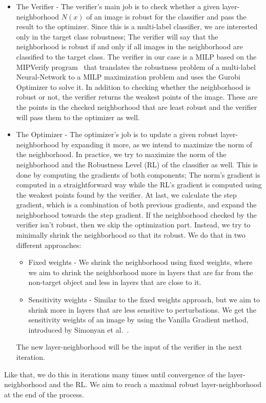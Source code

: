 \begin{itemize}
    \item The Verifier - The verifier's main job is to check whether a given layer-neighborhood $N(x)$ of an image is robust for the classifier and pass the result to the optimizer.
    Since this is a multi-label classifier, we are interested only in the target class robustness;
    The verifier will say that the neighborhood is robust if and only if all images in the neighborhood are classified to the target class.
    The verifier in our case is a MILP based on the MIPVerify program~\cite{MIPVERIFY} that translates the robustness problem of a multi-label Neural-Network to a MILP maximization problem and uses the Gurobi Optimizer to solve it.
    In addition to checking whether the neighborhood is robust or not, the verifier returns the weakest points of the image.
    These are the points in the checked neighborhood that are least robust and the verifier will pass them to the optimizer as well.
    \item The Optimizer - The optimizer's job is to update a given robust layer-neighborhood by expanding it more, as we intend to maximize the norm of the neighborhood.
    In practice, we try to maximize the norm of the neighborhood and the Robustness Level (RL) of the classifier as well.
    This is done by computing the gradients of both components;
    The norm's gradient is computed in a straightforward way while the RL's gradient is computed using the weakest points found by the verifier.
    At last, we calculate the step gradient, which is a combination of both previous gradients, and expand the neighborhood towards the step gradient.
    If the neighborhood checked by the verifier isn't robust, then we skip the optimization part.
    Instead, we try to minimally shrink the neighborhood so that its robust.
    We do that in two different approaches:
    \begin{itemize}
        \item Fixed weights - We shrink the neighborhood using fixed weights, where we aim to shrink the neighborhood more in layers that are far from the non-target object and less in layers that are close to it.
        \item Sensitivity weights - Similar to the fixed weights approach, but we aim to shrink more in layers that are less sensitive to perturbations.
        We get the sensitivity weights of an image by using the Vanilla Gradient method, introduced by Simonyan et al.~\cite{VANILLAGRADIENT}.
    \end{itemize}
    The new layer-neighborhood will be the input of the verifier in the next iteration.
\end{itemize}
Like that, we do this in iterations many times until convergence of the layer-neighborhood and the RL\@.
We aim to reach a maximal robust layer-neighborhood at the end of the process.
